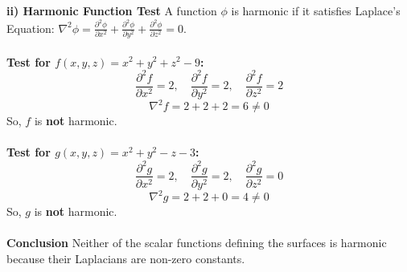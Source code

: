 \documentclass{article}
\begin{document}
\\
\\
\textbf{ii) Harmonic Function Test}
A function $\phi$ is harmonic if it satisfies Laplace's Equation:
$\nabla^2 \phi = \frac{\partial^2 \phi}{\partial x^2} + \frac{\partial^2 \phi}{\partial y^2} + \frac{\partial^2 \phi}{\partial z^2} = 0$.
\\
\\
\textbf{Test for $f(x,y,z) = x^2 + y^2 + z^2 - 9$:}
\[
	\frac{\partial^2 f}{\partial x^2} = 2, \quad \frac{\partial^2 f}{\partial y^2} = 2, \quad \frac{\partial^2 f}{\partial z^2} = 2
\]
\[
	\nabla^2 f = 2 + 2 + 2 = 6 \neq 0
\]
So, $f$ is \textbf{not} harmonic.
\\
\\
\textbf{Test for $g(x,y,z) = x^2 + y^2 - z - 3$:}
\[
	\frac{\partial^2 g}{\partial x^2} = 2, \quad \frac{\partial^2 g}{\partial y^2} = 2, \quad \frac{\partial^2 g}{\partial z^2} = 0
\]
\[
	\nabla^2 g = 2 + 2 + 0 = 4 \neq 0
\]
So, $g$ is \textbf{not} harmonic.
\\
\\
\textbf{Conclusion}
Neither of the scalar functions defining the surfaces is harmonic because their
Laplacians are non-zero constants.

\pagebreak

\end{document}

